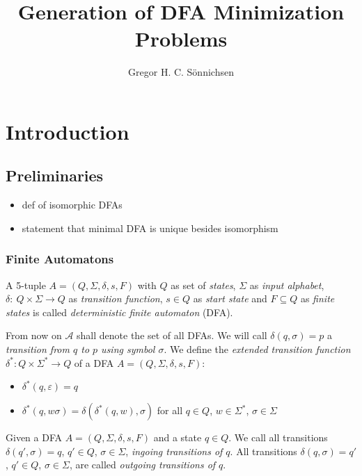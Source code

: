 \documentclass[a4paper, oneside, 11pt]{report}
\title{Generation of DFA Minimization Problems}
\author{Gregor H. C. Sönnichsen}
\theoremstyle{definition}
\theoremstyle{remark}
\begin{document}
\maketitle



\tableofcontents

\chapter{Introduction}

\section{Preliminaries}

\begin{itemize}
	\item def of isomorphic DFAs
	\item statement that minimal DFA is unique besides isomorphism
\end{itemize}

\subsection{Finite Automatons}

A 5-tuple $A = (Q, \Sigma, \delta, s, F)$ with $Q$ as set of \emph{states}, $\Sigma$ as \emph{input alphabet}, $\delta \colon\ Q \times \Sigma \to Q$ as \emph{transition function}, $s \in Q$ as \emph{start state} and $F \subseteq Q$ as \emph{finite states} is called \emph{deterministic finite automaton} (DFA).

From now on $\mathcal{A}$ shall denote the set of all DFAs. We will call $\delta(q,\sigma) = p$ a \emph{transition from $q$ to $p$ using symbol $\sigma$}.
We define the \emph{extended transition function} $\delta^* : Q \times \Sigma^* \to Q$ of a DFA $A = (Q, \Sigma, \delta, s, F)$:
\begin{itemize}
	\item $\delta^*(q,\varepsilon) = q$
	\item $\delta^*(q,w\sigma) = \delta(\delta^*(q,w),\sigma)$ for all $q \in Q$, $w \in \Sigma^*$, $\sigma \in \Sigma$
\end{itemize}
Given a DFA $A = (Q, \Sigma, \delta, s, F)$ and a state $q \in Q$. We call all transitions $\delta(q', \sigma) = q$, $q'\in Q$, $\sigma\in\Sigma$, \emph{ingoing transitions of $q$}. All transitions $\delta(q, \sigma) = q'$, $q'\in Q$, $\sigma\in\Sigma$, are called \emph{outgoing transitions of $q$}.
\end{document}
